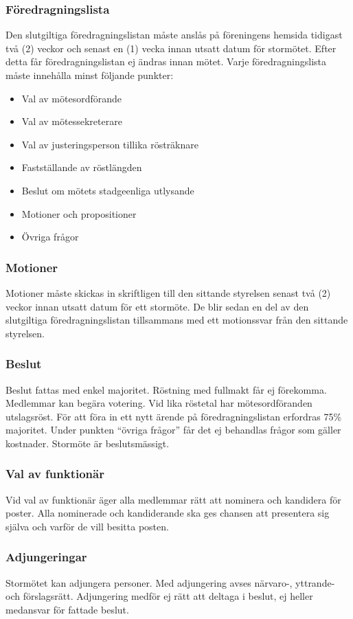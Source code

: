 \documentclass[11pt,a4paper]{article}
\begin{document}
\subsubsection{Föredragningslista}\label{sec:dagordning}
Den slutgiltiga föredragningslistan måste anslås på föreningens hemsida tidigast två (2) veckor och senast en (1) vecka innan utsatt datum för stormötet. Efter detta får föredragningslistan ej ändras innan mötet. Varje föredragningslista måste innehålla minst följande punkter:
\begin{itemize}
	\item Val av mötesordförande
	\item Val av mötessekreterare
	\item Val av justeringsperson tillika rösträknare
	\item Fastställande av röstlängden
	\item Beslut om mötets stadgeenliga utlysande
	\item Motioner och propositioner
	\item Övriga frågor
\end{itemize}
\subsubsection{Motioner}
Motioner måste skickas in skriftligen till den sittande styrelsen senast två (2) veckor innan utsatt datum för ett stormöte. De blir sedan en del av den slutgiltiga föredragningslistan tillsammans med ett motionssvar från den sittande styrelsen.
\subsubsection{Beslut}
Beslut fattas med enkel majoritet. Röstning med fullmakt får ej förekomma. Medlemmar kan begära votering. Vid lika röstetal har mötesordföranden utslagsröst. För att föra in ett nytt ärende på föredragningslistan erfordras 75\% majoritet. Under punkten  ``övriga frågor'' får det ej behandlas frågor som gäller kostnader. Stormöte är beslutsmässigt.
\subsubsection{Val av funktionär}
Vid val av funktionär äger alla medlemmar rätt att nominera och kandidera för poster. Alla nominerade och kandiderande ska ges chansen att presentera sig själva och varför de vill besitta posten.
\subsubsection{Adjungeringar}\label{sec:adjungering}
Stormötet kan adjungera personer. Med adjungering avses närvaro-, yttrande- och förslagsrätt. Adjungering medför ej rätt att deltaga i beslut, ej heller medansvar för fattade beslut.
\end{document}
